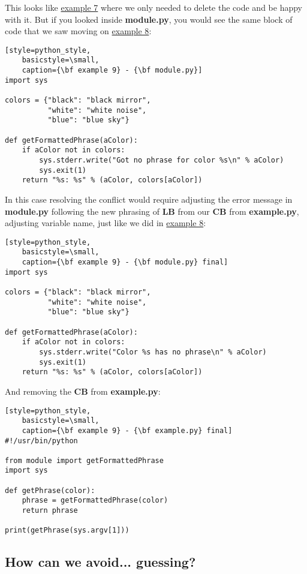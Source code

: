 This looks like \hyperref[example_07]{example 7} where we only needed to delete the code and be happy with it.
But if you looked inside {\bf module.py}, you would see the same block of code that we saw moving on
\hyperref[example_08]{example 8}:

\begin{lstlisting}[style=python_style,
	basicstyle=\small,
	caption={\bf example 9} - {\bf module.py}]
import sys

colors = {"black": "black mirror",
          "white": "white noise",
          "blue": "blue sky"}

def getFormattedPhrase(aColor):
    if aColor not in colors:
        sys.stderr.write("Got no phrase for color %s\n" % aColor)
        sys.exit(1)
    return "%s: %s" % (aColor, colors[aColor])
\end{lstlisting}
In this case resolving the conflict would require adjusting the error message in {\bf module.py} following the new
phrasing of {\bf LB} from our {\bf CB} from {\bf example.py}, adjusting variable name, just like we did in
\hyperref[example_08]{example 8}:

\begin{lstlisting}[style=python_style,
	basicstyle=\small,
	caption={\bf example 9} - {\bf module.py} final]
import sys

colors = {"black": "black mirror",
          "white": "white noise",
          "blue": "blue sky"}

def getFormattedPhrase(aColor):
    if aColor not in colors:
        sys.stderr.write("Color %s has no phrase\n" % aColor)
        sys.exit(1)
    return "%s: %s" % (aColor, colors[aColor])
\end{lstlisting}

And removing the {\bf CB} from {\bf example.py}:

\begin{lstlisting}[style=python_style,
	basicstyle=\small,
	caption={\bf example 9} - {\bf example.py} final]
#!/usr/bin/python

from module import getFormattedPhrase
import sys

def getPhrase(color):
    phrase = getFormattedPhrase(color)
    return phrase

print(getPhrase(sys.argv[1]))
\end{lstlisting}

\subsection{How can we avoid... guessing?}

